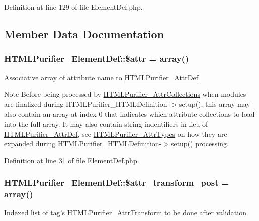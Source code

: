 Definition at line 129 of file Element\+Def.\+php.



\subsection{Member Data Documentation}
\hypertarget{classHTMLPurifier__ElementDef_a2bcbdb53248fe3df0ac956cde18f793f}{
\subsubsection[{\$attr}]{\setlength{\rightskip}{0pt plus 5cm}H\+T\+M\+L\+Purifier\+\_\+\+Element\+Def\+::\$attr = array()}}\label{classHTMLPurifier__ElementDef_a2bcbdb53248fe3df0ac956cde18f793f}
Associative array of attribute name to \hyperlink{classHTMLPurifier__AttrDef}{H\+T\+M\+L\+Purifier\+\_\+\+Attr\+Def} \begin{DoxyNote}{Note}
Before being processed by \hyperlink{classHTMLPurifier__AttrCollections}{H\+T\+M\+L\+Purifier\+\_\+\+Attr\+Collections} when modules are finalized during H\+T\+M\+L\+Purifier\+\_\+\+H\+T\+M\+L\+Definition-\/$>$setup(), this array may also contain an array at index 0 that indicates which attribute collections to load into the full array. It may also contain string indentifiers in lieu of \hyperlink{classHTMLPurifier__AttrDef}{H\+T\+M\+L\+Purifier\+\_\+\+Attr\+Def}, see \hyperlink{classHTMLPurifier__AttrTypes}{H\+T\+M\+L\+Purifier\+\_\+\+Attr\+Types} on how they are expanded during H\+T\+M\+L\+Purifier\+\_\+\+H\+T\+M\+L\+Definition-\/$>$setup() processing. 
\end{DoxyNote}


Definition at line 31 of file Element\+Def.\+php.

\hypertarget{classHTMLPurifier__ElementDef_a3085ac6ae100475e1ff86fe94910c12e}{
\subsubsection[{\$attr\+\_\+transform\+\_\+post}]{\setlength{\rightskip}{0pt plus 5cm}H\+T\+M\+L\+Purifier\+\_\+\+Element\+Def\+::\$attr\+\_\+transform\+\_\+post = array()}}\label{classHTMLPurifier__ElementDef_a3085ac6ae100475e1ff86fe94910c12e}
Indexed list of tag's \hyperlink{classHTMLPurifier__AttrTransform}{H\+T\+M\+L\+Purifier\+\_\+\+Attr\+Transform} to be done after validation 

